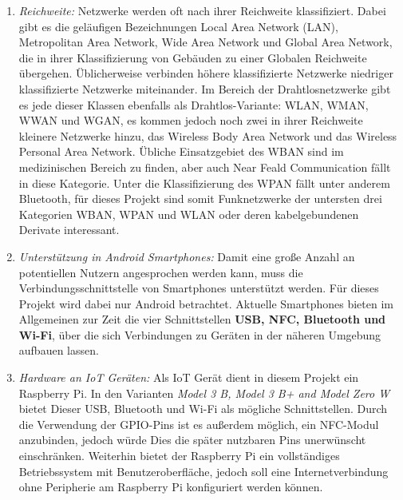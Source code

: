     \begin {enumerate}
    \item {\it Reichweite:}
    Netzwerke werden oft nach ihrer Reichweite klassifiziert. Dabei gibt es die geläufigen Bezeichnungen Local Area Network (LAN),
    Metropolitan Area Network, Wide Area Network und Global Area Network, die in ihrer Klassifizierung von Gebäuden zu einer Globalen Reichweite übergehen.
    Üblicherweise verbinden höhere klassifizierte Netzwerke niedriger klassifizierte Netzwerke miteinander. Im Bereich der Drahtlosnetzwerke gibt es jede
    dieser Klassen ebenfalls als Drahtlos-Variante: WLAN, WMAN, WWAN und WGAN, es kommen jedoch noch zwei in ihrer Reichweite kleinere Netzwerke hinzu,
    das Wireless Body Area Network und das Wireless Personal Area Network. Übliche Einsatzgebiet des WBAN sind im medizinischen Bereich zu finden,
    aber auch Near Feald Communication fällt in diese Kategorie. Unter die Klassifizierung des WPAN fällt unter anderem Bluetooth,
    für dieses Projekt sind somit Funknetzwerke der untersten drei Kategorien WBAN, WPAN und WLAN oder deren kabelgebundenen Derivate interessant.\cite[S.17]{AI-Lueders}
    \item {\it Unterstützung in Android Smartphones:}
    Damit eine große Anzahl an potentiellen Nutzern angesprochen werden kann, muss die Verbindungsschnittstelle von Smartphones unterstützt werden.
    Für dieses Projekt wird dabei nur Android betrachtet.
    Aktuelle Smartphones bieten im Allgemeinen zur Zeit die vier Schnittstellen {\bf USB, NFC, Bluetooth und Wi-Fi},
    über die sich Verbindungen zu Geräten in der näheren Umgebung aufbauen lassen.
    \item {\it Hardware an IoT Geräten:}
    Als IoT Gerät dient in diesem Projekt ein Raspberry Pi.
    In den Varianten {\it Model 3 B, Model 3 B+ and Model Zero W} bietet Dieser USB, Bluetooth und Wi-Fi als mögliche Schnittstellen.
    Durch die Verwendung der GPIO-Pins ist es außerdem möglich, ein NFC-Modul anzubinden,
    jedoch würde Dies die später nutzbaren Pins unerwünscht einschränken.
    Weiterhin bietet der Raspberry Pi ein vollständiges Betriebssystem mit Benutzeroberfläche, jedoch soll eine Internetverbindung
    ohne Peripherie am Raspberry Pi konfiguriert werden können. 
    \end {enumerate}

